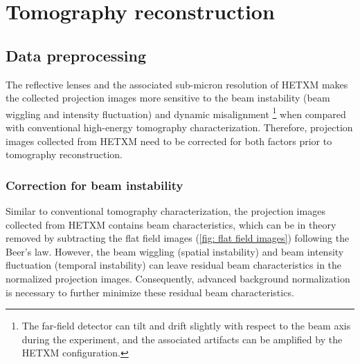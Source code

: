 \documentclass[12pt]{scrartcl}
\begin{document}
\section{Tomography reconstruction}\label{sec: tomo}

\subsection{Data preprocessing}\label{sec: preprocessing}

The reflective lenses and the associated sub-micron resolution of HETXM makes the collected projection images more sensitive to the beam instability (beam wiggling and intensity fluctuation) and dynamic misalignment%
\footnote{
The far-field detector can tilt and drift slightly with respect to the beam axis during the experiment, and the associated artifacts can be amplified by the HETXM configuration.
} 
when compared with conventional high-energy tomography characterization.
Therefore, projection images collected from HETXM need to be corrected for both factors prior to tomography reconstruction.

\subsubsection{
Correction for beam instability
}\label{sec: bg norm}

Similar to conventional tomography characterization, the projection images collected from HETXM contains beam characteristics, which can be in theory removed by subtracting the flat field images (\cref{fig: flat field images}) following the Beer's law. 
However, the beam wiggling (spatial instability) and beam intensity fluctuation (temporal instability) can leave residual beam characteristics in the normalized projection images.
Consequently, advanced background normalization is necessary to further minimize these residual beam characteristics.
\end{document}
